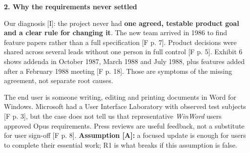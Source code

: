 \documentclass[11pt,a4paper]{article}
\newcommand{\PageTitle}[1]{{\fontsize{16}{19.6}\selectfont\bfseries #1}\par\vspace{6pt}}
\begin{document}
\PageTitle{2. Why the requirements never settled}
Our diagnosis [I]: the project never had \textbf{one agreed, testable product goal and a clear rule for changing it}. The new team arrived in 1986 to find feature papers rather than a full specification [F p. 7]. Product decisions were shared across several leads without one person in full control [F p. 5]. Exhibit 6 shows addenda in October 1987, March 1988 and July 1988, plus features added after a February 1988 meeting [F p. 18]. Those are symptoms of the missing agreement, not separate root causes.

The end user is someone writing, editing and printing documents in Word for Windows. Microsoft had a User Interface Laboratory with observed test subjects [F p. 3], but the case does not tell us that representative \emph{WinWord} users approved Opus requirements. Press reviews are useful feedback, not a substitute for user sign-off [F p. 8]. \textbf{Assumption [A]:} a focused update is enough for users to complete their essential work; R1 is what breaks if this assumption is false.
\end{document}
